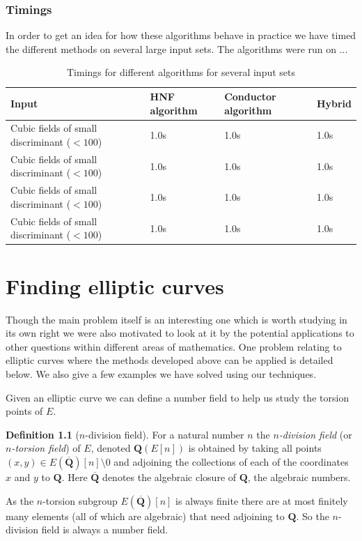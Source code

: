 \documentclass[12pt,a4paper,abstracton,bibtotoc]{scrreprt}
\theoremstyle{definition}
\newtheorem{defn}{Definition}
\newcommand{\QQ}{\mathbf{Q}}
\begin{document}
\subsection{Timings}
In order to get an idea for how these algorithms behave in practice we have timed the different methods on several large input sets.
The algorithms were run on ...
\begin{table}[H]
\begin{tabular}{|p{14em}|l|l|l|}
\hline
Input & HNF algorithm & Conductor algorithm & Hybrid \\
\hline
Cubic fields of small discriminant ($< 100$) & 1.0s & 1.0s & 1.0s \\
Cubic fields of small discriminant ($< 100$) & 1.0s & 1.0s & 1.0s \\
Cubic fields of small discriminant ($< 100$) & 1.0s & 1.0s & 1.0s \\
Cubic fields of small discriminant ($< 100$) & 1.0s & 1.0s & 1.0s \\
\hline
\end{tabular}
\caption{\label{tab:timings} Timings for different algorithms for several input sets}
\end{table}


\chapter{Finding elliptic curves}
\label{chap:ellapp}
Though the main problem itself is an interesting one which is worth studying in its own right we were also motivated to look at it by the potential applications to other questions within different areas of mathematics.
One problem relating to elliptic curves where the methods developed above can be applied is detailed below.
We also give a few examples we have solved using our techniques.

Given an elliptic curve we can define a number field to help us study the torsion points of $E$.

\begin{defn}[$n$-division field] %
For a natural number $n$ the \emph{$n$-division field} (or \emph{$n$-torsion field}) of $E$, denoted $\QQ(E[n])$ is obtained by taking all points $(x,y) \in E(\overline{\QQ})[n]\setminus 0$ and adjoining the collections of each of the coordinates $x$ and $y$ to $\QQ$.
Here $\overline{\QQ}$ denotes the algebraic closure of $\QQ$, the algebraic numbers. %
\end{defn}
As the $n$-torsion subgroup $E(\overline{\QQ})[n]$ is always finite there are at most finitely many elements (all of which are algebraic) that need adjoining to $\QQ$.
So the $n$-division field is always a number field. %
\end{document}
